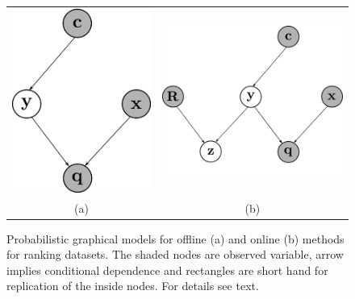 \documentclass{amia}
\begin{document}
\begin{figure}
\centering
\begin{tabular}{cc}
\includegraphics[scale=0.7]{offline-pgm.png} \hspace{0.3in} & \includegraphics[scale=0.7]{online-pgm.png}\\
(a) & (b)
\end{tabular}
\caption{Probabilistic graphical models for offline (a) and online (b) methods for ranking datasets. The shaded nodes are observed variable, arrow implies conditional dependence and rectangles are short hand for replication of the inside nodes. For details see text.}\label{fig:pgm}
\end{figure}
\end{document}
